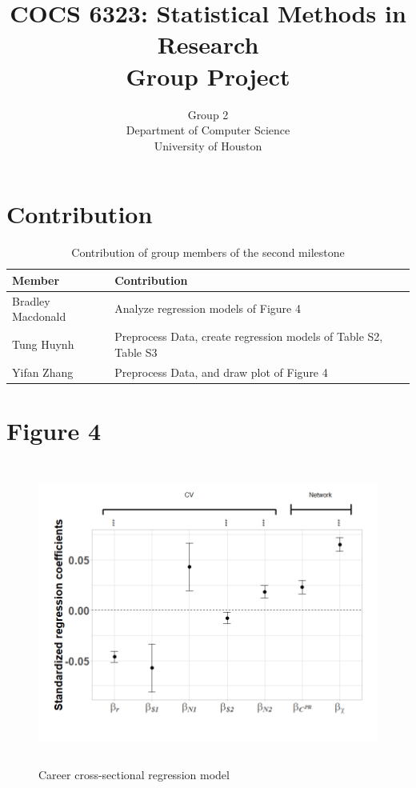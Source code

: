 \documentclass[10pt]{article}          %
\title{COCS 6323: Statistical Methods in Research \\ Group Project} %
\author{Group 2 \\
        Department of Computer Science\\
        University of Houston}         %
\begin{document}



\maketitle              %

\newpage
\tableofcontents        %
\listoftables           %
\listoffigures          %

\newpage
\section{Contribution}
\begin{table}[h]
\begin{tabular}{|p{4cm}|p{13cm}|}
\hline
\textbf{Member} & \textbf{Contribution} \\ \hline
Bradley Macdonald & Analyze regression models of Figure 4\\ \hline
Tung Huynh & Preprocess Data, create regression models of Table S2, Table S3\\ \hline
Yifan Zhang & Preprocess Data, and draw plot of Figure 4 \\ \hline
\end{tabular}
\caption{Contribution of group members of the second milestone}
\label{tbl:contribution}
\end{table}

\newpage
\section{Figure 4}

\begin{figure}[!htb]
  \centering
  \includegraphics[width=12cm, height=10cm]{Figure4.png}
  \caption{Career cross-sectional regression model}
  \label{Fig4}
\end{figure}
\end{document}

